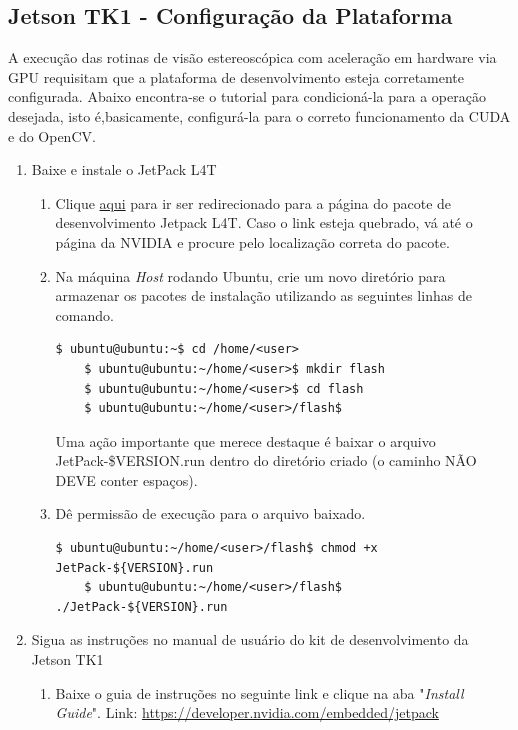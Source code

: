 \subsection{Jetson TK1 - Configuração da Plataforma}

A execução das rotinas de visão estereoscópica com aceleração em hardware via GPU requisitam que a plataforma de desenvolvimento esteja corretamente configurada. Abaixo encontra-se o tutorial para condicioná-la para a operação desejada, isto é,basicamente, configurá-la para o correto funcionamento da CUDA e do OpenCV. 

\begin{enumerate}
  \item Baixe e instale o JetPack L4T
    \begin{enumerate}
      \item Clique \href{http://docs.nvidia.com/jetpack-l4t/index.html#developertools/mobile/jetpack/jetpack_l4t/2.1/jetpack_l4t_install.htm}{aqui} para ir ser redirecionado para a página do pacote de desenvolvimento Jetpack L4T. Caso o link esteja quebrado, vá até o página da NVIDIA e procure pelo localização correta do pacote.  

      \item Na máquina \textit{Host} rodando Ubuntu, crie um novo diretório para armazenar os pacotes de instalação utilizando as seguintes linhas de comando.
      \begin{lstlisting}[basicstyle=\tiny]
	$ ubuntu@ubuntu:~$ cd /home/<user>
	$ ubuntu@ubuntu:~/home/<user>$ mkdir flash
	$ ubuntu@ubuntu:~/home/<user>$ cd flash
	$ ubuntu@ubuntu:~/home/<user>/flash$ 
      \end{lstlisting}
      Uma ação importante que merece destaque é baixar o arquivo JetPack-\${VERSION}.run dentro do diretório criado (o caminho NÃO DEVE conter espaços).
      
      \item Dê permissão de execução para o arquivo baixado. 
      \begin{lstlisting}[basicstyle=\tiny]
	$ ubuntu@ubuntu:~/home/<user>/flash$ chmod +x JetPack-${VERSION}.run
	$ ubuntu@ubuntu:~/home/<user>/flash$ ./JetPack-${VERSION}.run
      \end{lstlisting}
      
      
    \end{enumerate}
  \item Sigua as instruções no manual de usuário do kit de desenvolvimento da Jetson TK1
    \begin{enumerate}
     \item Baixe o guia de instruções no seguinte link e clique na aba "\textit{Install Guide}". Link: \url{https://developer.nvidia.com/embedded/jetpack}
    \end{enumerate}

\end{enumerate}



